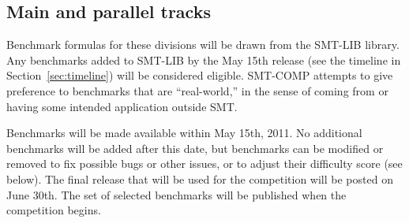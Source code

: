\documentclass[12pt]{article}
\begin{document}
\subsection{Main and parallel tracks}

Benchmark formulas for these divisions
will be drawn from the SMT-LIB library.  Any benchmarks added to
SMT-LIB by the May 15th release (see the timeline in
Section~\ref{sec:timeline}) will be considered eligible.  SMT-COMP
attempts to give preference to benchmarks that are ``real-world,'' in
the sense of coming from or having some intended application outside
SMT.

Benchmarks will be made available within May 15th, 2011.
No additional
benchmarks will be added after this date, but benchmarks can be
modified or removed to fix possible bugs or other issues, or to adjust their difficulty score (see below). 
The final release that will be used for the competition will be posted on June
30th. The set of selected benchmarks will be published when the
competition begins.
\end{document}

